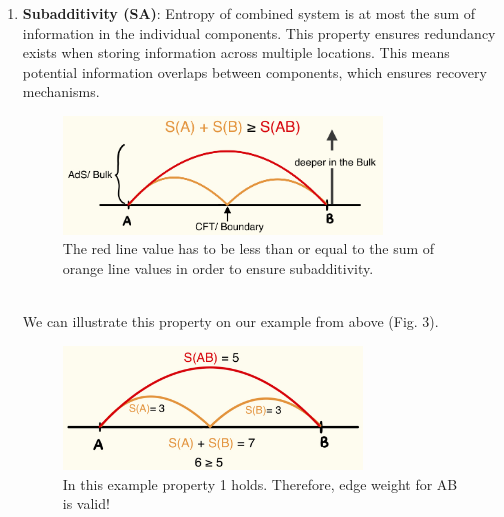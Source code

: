 \documentclass[12pt]{article}
\begin{document}
\begin{enumerate}
    \item \textbf{Subadditivity (SA)}: Entropy of combined system is at most the sum of information in the individual components.
    This property ensures redundancy exists when storing information across multiple locations. This means potential information overlaps between components, which ensures recovery mechanisms.
    \begin{figure}[htbp]  %
        \centering
        \includegraphics[width=0.8\textwidth,height=0.2\textheight]{sa.jpeg}  %
        \caption{The red line value has to be less than or equal to the sum of orange line values in order to ensure subadditivity.}  %
        \label{fig:Subadditivity}  %
    \end{figure}
    \\
    We can illustrate this property on our example from above (Fig. 3).
    \begin{figure}[htbp]  %
        \centering
        \includegraphics[width=0.75\textwidth,height=0.2\textheight]{sa_ex.jpeg}  %
        \caption{In this example property 1 holds. Therefore, edge weight for AB is valid!}  %
        \label{fig:Subadditivity Example}  %
    \end{figure}

    \newpage


\end{enumerate}
\end{document}
